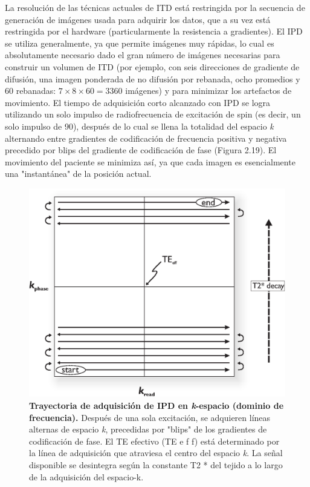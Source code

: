 \documentclass[12pt,a5,twoside]{book}
\begin{document}
La resolución de las técnicas actuales de ITD está restringida por la secuencia de generación de imágenes usada para adquirir los datos, que a su vez está restringida por el hardware (particularmente la resistencia a gradientes). El IPD se utiliza generalmente, ya que permite imágenes muy rápidas, lo cual es absolutamente necesario dado el gran número de imágenes necesarias para construir un volumen de ITD (por ejemplo, con seis direcciones de gradiente de difusión, una imagen ponderada de no difusión por rebanada, ocho promedios y 60 rebanadas: $7×8×60 = 3360$ imágenes) y para minimizar los artefactos de movimiento. El tiempo de adquisición corto alcanzado con IPD se logra utilizando un solo impulso de radiofrecuencia de excitación de spin (es decir, un solo impulso de 90\textdegree{}), después de lo cual se llena la totalidad del espacio {\it k} alternando entre gradientes de codificación de frecuencia positiva y negativa precedido por blips del gradiente de codificación de fase (Figura 2.19). El movimiento del paciente se minimiza así, ya que cada imagen es esencialmente una "instantánea" de la posición actual.

\begin{figure}
	\centering
    \includegraphics [scale=0.7,center] {kspace.eps}
    \caption{\textbf{Trayectoria de adquisición de IPD en {\it k}-espacio (dominio de frecuencia).} Después de una sola excitación, se adquieren líneas alternas de espacio {\it k}, precedidas por "blips" de los gradientes de codificación de fase. El TE efectivo (TE e f f) está determinado por la línea de adquisición que atraviesa el centro del espacio {\it k}. La señal disponible se desintegra según la constante T2 * del tejido a lo largo de la adquisición del espacio-k.}
    \label{F:kspace}
\end{figure}
\end{document}
